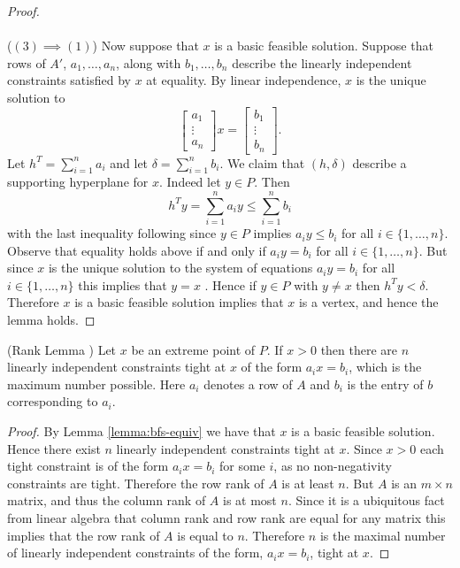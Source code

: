 \begin{proof}
\paragraph{}
($(3) \implies (1)$) Now suppose that $x$ is a basic feasible solution. Suppose that rows of $A'$, $a_1, \dots, a_n$, along with $b_1, \dots, b_n$ describe the linearly independent constraints satisfied by $x$ at equality. By linear independence, $x$ is the unique solution to 
$$\begin{bmatrix} a_1 \\ \vdots \\ a_n \end{bmatrix} x = \begin{bmatrix} b_1 \\ \vdots \\ b_n \end{bmatrix}.$$
Let $h^T = \sum_{i=1}^n a_i$ and let $\delta = \sum_{i=1}^n b_i$. We claim that $(h, \delta)$ describe a supporting hyperplane for $x$. Indeed let $y \in P$. Then 
$$ h^T y = \sum_{i=1}^n a_i y \leq \sum_{i=1}^n b_i$$
with the last inequality following since $y \in P$ implies $a_i y \leq b_i$ for all $i \in \{1, \dots, n\}$. Observe that equality holds above if and only if $a_i y = b_i$ for all $i\in\{1,\dots,n\}$. But since $x$ is the unique solution to the system of equations $a_i y = b_i$ for all $i\in\{1,\dots,n\}$ this implies that $y = x$ . Hence if $y \in P$ with $y \neq x$ then $h^T y < \delta$. Therefore $x$ is a basic feasible solution implies that $x$ is a vertex, and hence the lemma holds. 
\end{proof}

\begin{lemma}\label{lemma:rank}
(Rank Lemma \cite{lau2011iterative}) Let $x$ be an extreme point of $P$. If $x>0$ then there are $n$ linearly independent constraints tight at $x$ of the form $a_ix = b_i$, which is the maximum number possible. Here $a_i$ denotes a row of $A$ and $b_i$ is the entry of $b$ corresponding to $a_i$.  
\end{lemma}
\begin{proof}
By Lemma \ref{lemma:bfs-equiv} we have that $x$ is a basic feasible solution. Hence there exist $n$ linearly independent constraints tight at $x$. Since $x>0$ each tight constraint is of the form $a_i x = b_i$ for some $i$, as no non-negativity constraints are tight. Therefore the row rank of $A$ is at least $n$. But $A$ is an $m \times n$ matrix, and thus the column rank of $A$ is at most $n$. Since it is a ubiquitous fact from linear algebra that column rank and row rank are equal for any matrix this implies that the row rank of $A$ is equal to $n$. Therefore $n$ is the maximal number of linearly independent constraints of the form, $a_i x = b_i$, tight at $x$.
\end{proof}

